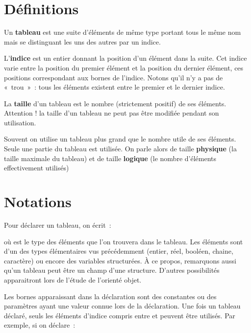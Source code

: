 \section{Définitions}

	Un \textbf{tableau} est une suite d’éléments de même type 
	portant tous le même nom mais se distinguant 
	les uns des autres par un indice.

	L’\textbf{indice} est un entier 
	donnant la position d’un élément dans la suite. 
	Cet indice varie entre la position du premier élément 
	et la position du dernier élément, 
	ces positions correspondant aux bornes de l’indice.
	Notons qu'il n'y a pas de «~trou~»~: 
	tous les éléments existent entre le premier et le dernier indice.

	La \textbf{taille} d’un tableau 
	est le nombre (strictement positif) de ses éléments.
	Attention ! la taille d’un tableau ne peut pas être modifiée pendant
	son utilisation.

	Souvent on utilise un tableau plus grand que
	le nombre utile de ses éléments. 
	Seule une partie du tableau est utilisée. 
	On parle alors de taille \textbf{physique}
	(la taille maximale du tableau) 
	et de taille \textbf{logique}
	(le nombre d'éléments effectivement utilisés)

\section{Notations}

	Pour déclarer un tableau, on écrit~:

	
	où  est le type des éléments que l’on
	trouvera dans le tableau. Les éléments sont d’un des types élémentaires
	vus précédemment (entier, réel, booléen, chaine, caractère) ou encore
	des variables structurées. À ce propos, remarquons aussi
	qu'un tableau peut être un champ d'une structure. 
	D'autres possibilités apparaitront lors de l'étude de
	l'orienté objet.

	Les bornes apparaissant dans la déclaration sont des constantes ou des
	paramètres ayant une valeur connue lors de la déclaration. Une fois un
	tableau déclaré, seuls les éléments d’indice compris entre
	 et  peuvent
	être utilisés. Par exemple, si on déclare~:


